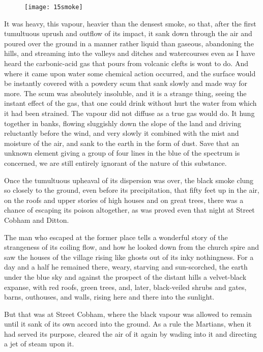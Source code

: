 \begin{figure}[tb!]
\centering
\texttt{[image: 15smoke]}
\end{figure}

It was heavy, this vapour, heavier than the densest smoke, so that, after the first tumultuous uprush and outflow of its impact, it sank down through the air and poured over the ground in a manner rather liquid than gaseous, abandoning the hills, and streaming into the valleys and ditches and watercourses even as I have heard the carbonic-acid gas that pours from volcanic clefts is wont to do. And where it came upon water some chemical action occurred, and the surface would be instantly covered with a powdery scum that sank slowly and made way for more. The scum was absolutely insoluble, and it is a strange thing, seeing the instant effect of the gas, that one could drink without hurt the water from which it had been strained. The vapour did not diffuse as a true gas would do. It hung together in banks, flowing sluggishly down the slope of the land and driving reluctantly before the wind, and very slowly it combined with the mist and moisture of the air, and sank to the earth in the form of dust. Save that an unknown element giving a group of four lines in the blue of the spectrum is concerned, we are still entirely ignorant of the nature of this substance.

Once the tumultuous upheaval of its dispersion was over, the black smoke clung so closely to the ground, even before its precipitation, that fifty feet up in the air, on the roofs and upper stories of high houses and on great trees, there was a chance of escaping its poison altogether, as was proved even that night at Street Cobham and Ditton.

The man who escaped at the former place tells a wonderful story of the strangeness of its coiling flow, and how he looked down from the church spire and saw the houses of the village rising like ghosts out of its inky nothingness. For a day and a half he remained there, weary, starving and sun-scorched, the earth under the blue sky and against the prospect of the distant hills a velvet-black expanse, with red roofs, green trees, and, later, black-veiled shrubs and gates, barns, outhouses, and walls, rising here and there into the sunlight.

But that was at Street Cobham, where the black vapour was allowed to remain until it sank of its own accord into the ground. As a rule the Martians, when it had served its purpose, cleared the air of it again by wading into it and directing a jet of steam upon it.

